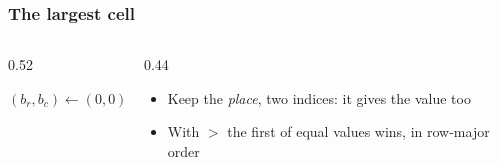 \documentclass[aspectratio=169,10pt,compress]{beamer}
\begin{document}
\begin{frame}[t,fragile] \frametitle{The largest cell}
	\begin{columns}[T]
		\begin{column}{0.52\textwidth}


\begin{algorithm}[H]
				\caption{LargestCell($t$), at least one cell}
				$(b_{r}, b_{c}) \gets (0, 0)$ 
				\;
\end{algorithm}

		\end{column}
		\begin{column}{0.44\textwidth}
			\begin{center}
			\end{center}
			\begin{itemize}\small
				\item Keep the \emph{place}, two indices: it gives the value too
				\item With $>$ the first of equal values wins, in row-major order
			\end{itemize}
		\end{column}
	\end{columns}
\end{frame}
\end{document}
